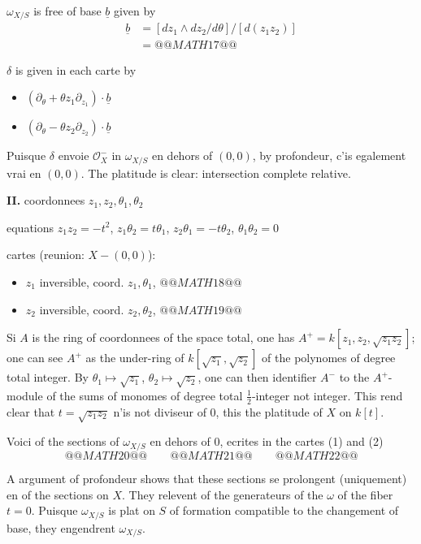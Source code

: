 \documentclass[11pt,a4paper]{article}
\theoremstyle{plain}
\theoremstyle{definition}
\begin{document}
$\omega_{X/S}$ is free of base $\underline{b}$ given by
\[
\begin{aligned}
\underline{b} &= [dz_1 \wedge dz_2 / d\theta] / [d(z_1 z_2)] \\
&= @@MATH17@@
\end{aligned}
\]

$\delta$ is given in each carte by
\begin{itemize}
\item[(1)] $(\partial_\theta + \theta z_1\partial_{z_1}) \cdot \underline{b}$
\item[(2)] $(\partial_\theta - \theta z_2\partial_{z_2}) \cdot \underline{b}$
\end{itemize}

Puisque $\delta$ envoie $\mathcal{O}_X^-$ in $\omega_{X/S}$ en dehors of $(0,0)$, by profondeur, c'is egalement vrai en $(0,0)$. The platitude is clear: intersection complete relative.

\medskip

\noindent \textbf{II.} coordonnees $z_1, z_2, \theta_1, \theta_2$

equations $z_1 z_2 = -t^2$, $z_1\theta_2 = t\theta_1$, $z_2\theta_1 = -t\theta_2$, $\theta_1\theta_2 = 0$

cartes (reunion: $X - (0,0)$):
\begin{itemize}
\item[(1)] $z_1$ inversible, coord. $z_1, \theta_1$, $@@MATH18@@$
\item[(2)] $z_2$ inversible, coord. $z_2, \theta_2$, $@@MATH19@@$
\end{itemize}

\newpage

Si $A$ is the ring of coordonnees of the space total, one has $A^+ = k[z_1, z_2, \sqrt{z_1 z_2}]$; one can see $A^+$ as the under-ring of $k[\sqrt{z_1}, \sqrt{z_2}]$ of the polynomes of degree total integer. By $\theta_1 \mapsto \sqrt{z_1}$, $\theta_2 \mapsto \sqrt{z_2}$, one can then identifier $A^-$ to the $A^+$-module of the sums of monomes of degree total $\frac{1}{2}$-integer not integer. This rend clear that $t = \sqrt{z_1 z_2}$ n'is not diviseur of 0, this the platitude of $X$ on $k[t]$.

Voici of the sections of $\omega_{X/S}$ en dehors of 0, ecrites in the cartes (1) and (2)
\[
@@MATH20@@ \qquad
@@MATH21@@ \qquad
@@MATH22@@
\]

A argument of profondeur shows that these sections se prolongent (uniquement) en of the sections on $X$. They relevent of the generateurs of the $\omega$ of the fiber $t=0$. Puisque $\omega_{X/S}$ is plat on $S$ of formation compatible to the changement of base, they engendrent $\omega_{X/S}$.
\end{document}
